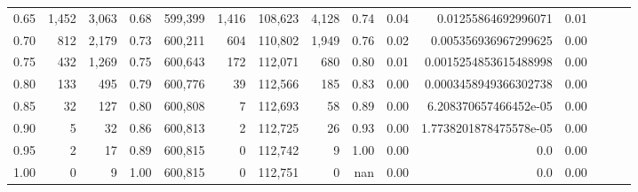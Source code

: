 \begin{tabular}{rrrrrrrrrrrrrrr}
0.65 &    1,452 &   3,063 &  0.68 &  599,399 &    1,416 &  108,623 &    4,128 &  0.74 &  0.04 &     0.01255864692996071 &      0.01 \\
0.70 &      812 &   2,179 &  0.73 &  600,211 &      604 &  110,802 &    1,949 &  0.76 &  0.02 &    0.005356936967299625 &      0.00 \\
0.75 &      432 &   1,269 &  0.75 &  600,643 &      172 &  112,071 &      680 &  0.80 &  0.01 &   0.0015254853615488998 &      0.00 \\
0.80 &      133 &     495 &  0.79 &  600,776 &       39 &  112,566 &      185 &  0.83 &  0.00 &   0.0003458949366302738 &      0.00 \\
0.85 &       32 &     127 &  0.80 &  600,808 &        7 &  112,693 &       58 &  0.89 &  0.00 &   6.208370657466452e-05 &      0.00 \\
0.90 &        5 &      32 &  0.86 &  600,813 &        2 &  112,725 &       26 &  0.93 &  0.00 &  1.7738201878475578e-05 &      0.00 \\
0.95 &        2 &      17 &  0.89 &  600,815 &        0 &  112,742 &        9 &  1.00 &  0.00 &                     0.0 &      0.00 \\
1.00 &        0 &       9 &  1.00 &  600,815 &        0 &  112,751 &        0 &   nan &  0.00 &                     0.0 &      0.00 \\
\bottomrule
\end{tabular}

